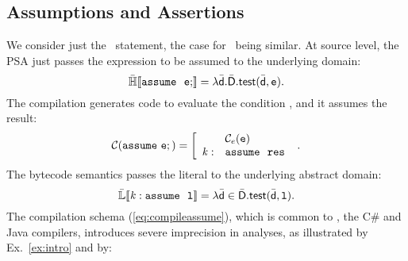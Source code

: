 \documentclass{llncs}
\begin{document}
\subsection{Assumptions and Assertions}
We consider just the \Assume\ statement, the case for \Assert\ being similar.
At source level, the PSA just passes the expression to be assumed to the underlying domain:
\begin{equation*}
\HLSem{\Assume\ \code{e};} = \lambda \ael{d}. \adom{D}.\atest(\ael{d}, \code{e}).
\end{equation*}
The compilation generates code to evaluate the condition , and it assumes the result:
\begin{equation}
  \Comp(\Assume \code{e};) = \left[ \begin{array}{ll}&\CompExp(\code{e})\\ \mathit{k} :&   \Assume\ \result  \end{array} \right. \ .
\label{eq:compileassume}
\end{equation}
The bytecode semantics passes the literal to the underlying abstract domain:
\begin{equation*}
\mathbb{\bar{L}}\llbracket \mathtt{\mathit{k} : \mathtt{assume}~\ \mathtt{l}} \rrbracket = \lambda \bar{\mathsf{d}} \in \bar{\mathsf{D}}.\mathsf{\mathsf{test}}(\bar{\mathsf{d}}, \mathtt{l}).
\end{equation*}
The compilation schema (\ref{eq:compileassume}), which is common to \eg, the C\# and Java compilers, introduces severe imprecision in analyses, as illustrated by Ex.~\ref{ex:intro} and by:
\end{document}
